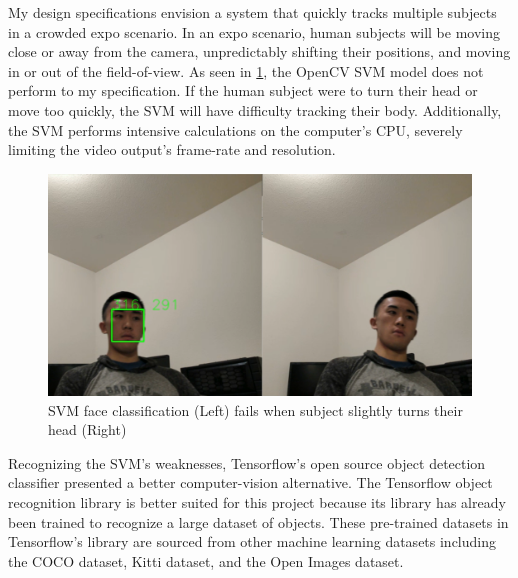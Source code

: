 \documentclass[onecolumn, draftclsnofoot,10pt, compsoc]{IEEEtran}
\makeatletter
\newcommand\captionof[1]{\def\@captype{#1}\caption}
\makeatother
\begin{document}
\begin{singlespace}
			
			My design specifications envision a system that quickly tracks multiple subjects in a crowded expo scenario.
			In an expo scenario, human subjects will be moving close or away from the camera, unpredictably shifting their positions, and moving in or out of the field-of-view.
			As seen in \ref{svm}, the OpenCV SVM model does not perform to my specification.
			If the human subject were to turn their head or move too quickly, the SVM will have difficulty tracking their body.
			Additionally, the SVM performs intensive calculations on the computer's CPU, severely limiting the video output's frame-rate and resolution.
			

			\begin{figure}[H]
			\includegraphics[scale=0.75]{svm.PNG}
			\captionof{figure}{SVM face classification (Left) fails when subject slightly turns their head (Right)}
			\label{svm}
			\end{figure}


			Recognizing the SVM's weaknesses, Tensorflow's open source object detection classifier presented a better computer-vision alternative. \cite{tensorflow}
			The Tensorflow object recognition library is better suited for this project because its library has already been trained to recognize a large dataset of objects. \cite{convolutional_object_detectors}
			These pre-trained datasets in Tensorflow's library are sourced from other machine learning datasets including the COCO dataset, Kitti dataset, and the Open Images dataset. \cite{coco} \cite{open_images} \cite{kitti}



\end{singlespace}
\end{document}
